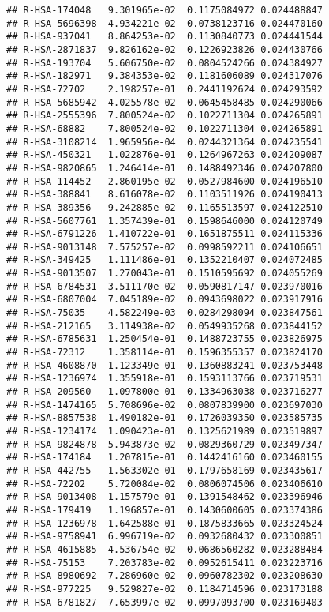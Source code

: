 \documentclass[
]{article}
\begin{document}
\begin{verbatim}
## R-HSA-174048   9.301965e-02  0.1175084972 0.024488847
## R-HSA-5696398  4.934221e-02  0.0738123716 0.024470160
## R-HSA-937041   8.864253e-02  0.1130840773 0.024441544
## R-HSA-2871837  9.826162e-02  0.1226923826 0.024430766
## R-HSA-193704   5.606750e-02  0.0804524266 0.024384927
## R-HSA-182971   9.384353e-02  0.1181606089 0.024317076
## R-HSA-72702    2.198257e-01  0.2441192624 0.024293592
## R-HSA-5685942  4.025578e-02  0.0645458485 0.024290066
## R-HSA-2555396  7.800524e-02  0.1022711304 0.024265891
## R-HSA-68882    7.800524e-02  0.1022711304 0.024265891
## R-HSA-3108214  1.965956e-04  0.0244321364 0.024235541
## R-HSA-450321   1.022876e-01  0.1264967263 0.024209087
## R-HSA-9820865  1.246414e-01  0.1488492346 0.024207800
## R-HSA-114452   2.860195e-02  0.0527984600 0.024196510
## R-HSA-388841   8.616078e-02  0.1103511926 0.024190413
## R-HSA-389356   9.242885e-02  0.1165513597 0.024122510
## R-HSA-5607761  1.357439e-01  0.1598646000 0.024120749
## R-HSA-6791226  1.410722e-01  0.1651875511 0.024115336
## R-HSA-9013148  7.575257e-02  0.0998592211 0.024106651
## R-HSA-349425   1.111486e-01  0.1352210407 0.024072485
## R-HSA-9013507  1.270043e-01  0.1510595692 0.024055269
## R-HSA-6784531  3.511170e-02  0.0590817147 0.023970016
## R-HSA-6807004  7.045189e-02  0.0943698022 0.023917916
## R-HSA-75035    4.582249e-03  0.0284298094 0.023847561
## R-HSA-212165   3.114938e-02  0.0549935268 0.023844152
## R-HSA-6785631  1.250454e-01  0.1488723755 0.023826975
## R-HSA-72312    1.358114e-01  0.1596355357 0.023824170
## R-HSA-4608870  1.123349e-01  0.1360883241 0.023753448
## R-HSA-1236974  1.355918e-01  0.1593113766 0.023719531
## R-HSA-209560   1.097800e-01  0.1334963038 0.023716277
## R-HSA-1474165  5.708696e-02  0.0807839900 0.023697030
## R-HSA-8857538  1.490182e-01  0.1726039350 0.023585735
## R-HSA-1234174  1.090423e-01  0.1325621989 0.023519897
## R-HSA-9824878  5.943873e-02  0.0829360729 0.023497347
## R-HSA-174184   1.207815e-01  0.1442416160 0.023460155
## R-HSA-442755   1.563302e-01  0.1797658169 0.023435617
## R-HSA-72202    5.720084e-02  0.0806074506 0.023406610
## R-HSA-9013408  1.157579e-01  0.1391548462 0.023396946
## R-HSA-179419   1.196857e-01  0.1430600605 0.023374386
## R-HSA-1236978  1.642588e-01  0.1875833665 0.023324524
## R-HSA-9758941  6.996719e-02  0.0932680432 0.023300851
## R-HSA-4615885  4.536754e-02  0.0686560282 0.023288484
## R-HSA-75153    7.203783e-02  0.0952615411 0.023223716
## R-HSA-8980692  7.286960e-02  0.0960782302 0.023208630
## R-HSA-977225   9.529827e-02  0.1184714596 0.023173188
## R-HSA-6781827  7.653997e-02  0.0997093700 0.023169403

\end{verbatim}
\end{document}
